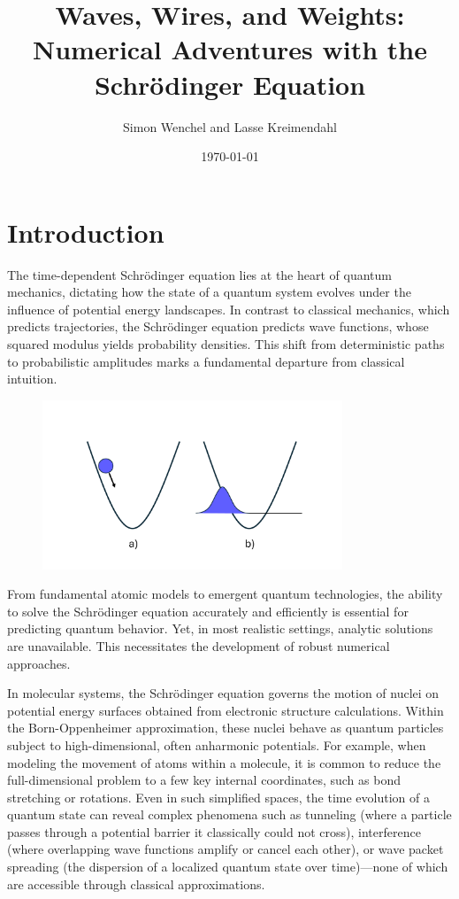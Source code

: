 \documentclass{article}
\theoremstyle{definition}
\theoremstyle{plain}
\theoremstyle{remark}
\begin{document}
\title{Waves, Wires, and Weights: Numerical Adventures with the Schrödinger Equation}
\author{Simon Wenchel and Lasse Kreimendahl}
\date{\today}
\maketitle

\tableofcontents

\newpage

\section{Introduction}

The time-dependent Schrödinger equation lies at the heart of quantum mechanics, dictating how the state of a quantum system evolves under the influence of potential energy landscapes. In contrast to classical mechanics, which predicts trajectories, the Schrödinger equation predicts wave functions, whose squared modulus yields probability densities. This shift from deterministic paths to probabilistic amplitudes marks a fundamental departure from classical intuition.

\begin{figure}[h]
    \centering
    \includegraphics[width=0.8\textwidth]{figures/Figure1.pdf}
    \caption{}
    \label{fig:fig1}
\end{figure}

From fundamental atomic models to emergent quantum technologies, the ability to solve the Schrödinger equation accurately and efficiently is essential for predicting quantum behavior. Yet, in most realistic settings, analytic solutions are unavailable. This necessitates the development of robust numerical approaches.

In molecular systems, the Schrödinger equation governs the motion of nuclei on potential energy surfaces obtained from electronic structure calculations. Within the Born-Oppenheimer approximation, these nuclei behave as quantum particles subject to high-dimensional, often anharmonic potentials. For example, when modeling the movement of atoms within a molecule, it is common to reduce the full-dimensional problem to a few key internal coordinates, such as bond stretching or rotations. Even in such simplified spaces, the time evolution of a quantum state can reveal complex phenomena such as tunneling (where a particle passes through a potential barrier it classically could not cross), interference (where overlapping wave functions amplify or cancel each other), or wave packet spreading (the dispersion of a localized quantum state over time)—none of which are accessible through classical approximations.
\end{document}
